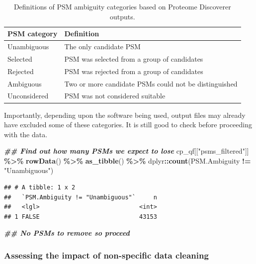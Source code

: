 \documentclass[9pt,a4paper,]{extarticle}
\newenvironment{Shaded}{\begin{snugshade}}{\end{snugshade}}
\newcommand{\DocumentationTok}[1]{\textcolor[rgb]{0.56,0.35,0.01}{\textbf{\textit{#1}}}}
\newcommand{\FunctionTok}[1]{\textcolor[rgb]{0.13,0.29,0.53}{\textbf{#1}}}
\newcommand{\NormalTok}[1]{#1}
\newcommand{\SpecialCharTok}[1]{\textcolor[rgb]{0.81,0.36,0.00}{\textbf{#1}}}
\newcommand{\StringTok}[1]{\textcolor[rgb]{0.31,0.60,0.02}{#1}}
\begin{document}
\begin{table}

\caption{\label{tab:table3}Definitions of PSM ambiguity categories based on Proteome Discoverer outputs.}
\centering
\begin{tabular}[t]{l|l}
\hline
PSM category & Definition\\
\hline
Unambiguous & The only candidate PSM\\
\hline
Selected & PSM was selected from a group of candidates\\
\hline
Rejected & PSM was rejected from a group of candidates\\
\hline
Ambiguous & Two or more candidate PSMs could not be distinguished\\
\hline
Unconsidered & PSM was not considered suitable\\
\hline
\end{tabular}
\end{table}

Importantly, depending upon the software being used, output files may already
have excluded some of these categories. It is still good to check before
proceeding with the data.

\begin{Shaded}
\begin{Highlighting}[]
\DocumentationTok{\#\# Find out how many PSMs we expect to lose}
\NormalTok{cp\_qf[[}\StringTok{"psms\_filtered"}\NormalTok{]] }\SpecialCharTok{\%\textgreater{}\%} 
  \FunctionTok{rowData}\NormalTok{() }\SpecialCharTok{\%\textgreater{}\%} 
  \FunctionTok{as\_tibble}\NormalTok{() }\SpecialCharTok{\%\textgreater{}\%} 
\NormalTok{  dplyr}\SpecialCharTok{::}\FunctionTok{count}\NormalTok{(PSM.Ambiguity }\SpecialCharTok{!=} \StringTok{"Unambiguous"}\NormalTok{)}
\end{Highlighting}
\end{Shaded}

\begin{verbatim}
## # A tibble: 1 x 2
##   `PSM.Ambiguity != "Unambiguous"`     n
##   <lgl>                            <int>
## 1 FALSE                            43153
\end{verbatim}

\begin{Shaded}
\begin{Highlighting}[]
\DocumentationTok{\#\# No PSMs to remove so proceed}
\end{Highlighting}
\end{Shaded}

\hypertarget{assessing-the-impact-of-non-specific-data-cleaning}{%
\subsubsection{Assessing the impact of non-specific data cleaning}\label{assessing-the-impact-of-non-specific-data-cleaning}}
\end{document}
